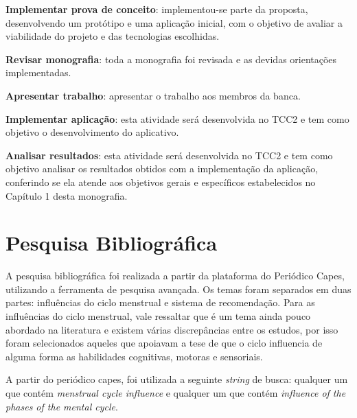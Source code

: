 \textbf{Implementar prova de conceito}: implementou-se parte da proposta, desenvolvendo um protótipo e uma aplicação inicial, com o objetivo 
de avaliar a viabilidade do projeto e das tecnologias escolhidas.

\textbf{Revisar monografia}: toda a monografia foi revisada e as devidas orientações implementadas.
 
\textbf{Apresentar trabalho}: apresentar o trabalho aos membros da banca.

\textbf{Implementar aplicação}: esta atividade será desenvolvida no TCC2 e tem como objetivo 
o desenvolvimento do aplicativo.

\textbf{Analisar resultados}: esta atividade será desenvolvida no TCC2 e tem como objetivo 
analisar os resultados obtidos com a implementação da aplicação, conferindo se ela atende 
aos objetivos gerais e específicos estabelecidos no Capítulo 1 desta monografia.

\section{Pesquisa Bibliográfica}

A pesquisa bibliográfica foi realizada a partir da plataforma do Periódico Capes, utilizando a ferramenta de pesquisa avançada.
Os temas foram separados em duas partes: influências do ciclo menstrual e sistema de recomendação.
Para as influências do ciclo menstrual, vale ressaltar que é um tema ainda pouco abordado na literatura e existem 
várias discrepâncias entre os estudos, por isso foram selecionados aqueles que apoiavam a tese de que 
o ciclo influencia de alguma forma as habilidades cognitivas, motoras e sensoriais. 




A partir do periódico capes, foi utilizada a seguinte \emph{string} de busca:
qualquer um que contém \emph{menstrual cycle influence} e qualquer um que contém 
\emph{influence of the phases of the mental cycle}. 

